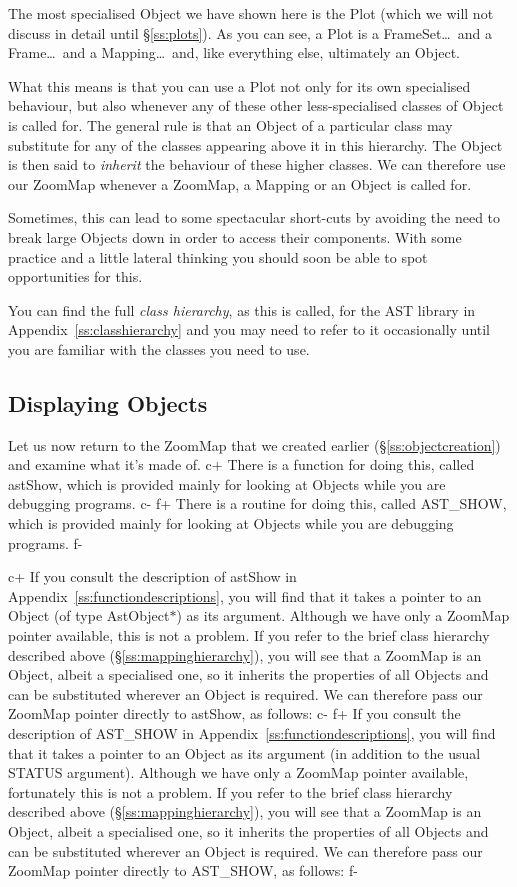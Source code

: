 \documentclass[twoside,11pt]{starlink}
\providecommand{\appref}[1]{Appendix~\ref{#1}}
\providecommand{\secref}[1]{\S\ref{#1}}
\begin{document}
The most specialised Object we have shown here is the Plot (which we
will not discuss in detail until \secref{ss:plots}). As you can see, a
Plot is a FrameSet\ldots\ and a Frame\ldots\ and a Mapping\ldots\ and,
like everything else, ultimately an Object.

What this means is that you can use a Plot not only for its own
specialised behaviour, but also whenever any of these other
less-specialised classes of Object is called for. The general rule is
that an Object of a particular class may substitute for any of the
classes appearing above it in this hierarchy. The Object is then said
to \emph{inherit} the behaviour of these higher classes. We can
therefore use our ZoomMap whenever a ZoomMap, a Mapping or an Object
is called for.

Sometimes, this can lead to some spectacular short-cuts by avoiding
the need to break large Objects down in order to access their
components. With some practice and a little lateral thinking you
should soon be able to spot opportunities for this.

You can find the full \emph{class hierarchy}, as this is called, for
the AST library in \appref{ss:classhierarchy} and you may need to
refer to it occasionally until you are familiar with the classes you
need to use.

\subsection{\label{ss:displayingobjects}Displaying Objects}

Let us now return to the ZoomMap that we created earlier
(\secref{ss:objectcreation}) and examine what it's made of.
c+
There is a function for doing this, called astShow, which is provided
mainly for looking at Objects while you are debugging programs.
c-
f+
There is a routine for doing this, called AST\_SHOW, which is provided
mainly for looking at Objects while you are debugging programs.
f-

c+
If you consult the description of astShow in
\appref{ss:functiondescriptions}, you will find that it takes a
pointer to an Object (of type AstObject$*$) as its argument. Although
we have only a ZoomMap pointer available, this is not a problem. If
you refer to the brief class hierarchy described above
(\secref{ss:mappinghierarchy}), you will see that a ZoomMap is an
Object, albeit a specialised one, so it inherits the properties of all
Objects and can be substituted wherever an Object is required.  We can
therefore pass our ZoomMap pointer directly to astShow, as follows:
c-
f+
If you consult the description of AST\_SHOW in
\appref{ss:functiondescriptions}, you will find that it takes a
pointer to an Object as its argument (in addition to the usual STATUS
argument). Although we have only a ZoomMap pointer available,
fortunately this is not a problem. If you refer to the brief class
hierarchy described above (\secref{ss:mappinghierarchy}), you will see
that a ZoomMap is an Object, albeit a specialised one, so it inherits
the properties of all Objects and can be substituted wherever an
Object is required.  We can therefore pass our ZoomMap pointer
directly to AST\_SHOW, as follows:
f-
\end{document}
